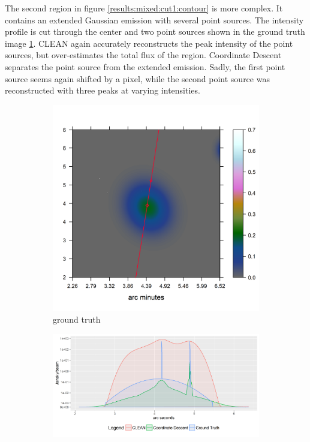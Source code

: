 The second region in figure \ref{results:mixed:cut1:contour} is more complex. It contains an extended Gaussian emission with several point sources. The intensity profile is cut through the center and two point sources shown in the ground truth image \ref{results:mixed:cut1:img}. CLEAN again accurately reconstructs the peak intensity of the point sources, but over-estimates the total flux of the region. Coordinate Descent separates the point source from the extended emission. Sadly, the first point source seems again shifted by a pixel, while the second point source was reconstructed with three peaks at varying intensities.

\begin{figure}[h]
	\centering
	\begin{subfigure}[b]{0.3\linewidth}
		\includegraphics[width=\linewidth, trim={0.4in, 0.9in, 3.2in, 1.8in}, clip]{./chapters/20.results/mixed/mixed_cut_model2_line.png}
		\caption{ground truth}
		\label{results:mixed:cut1:img}
	\end{subfigure}
	\begin{subfigure}[b]{0.6\linewidth}
		\includegraphics[width=\linewidth, trim={0, 0, 0.2in, 0.05in}, clip]{./chapters/20.results/mixed/mixed_cut2.png}

\end{subfigure}
\end{figure}
